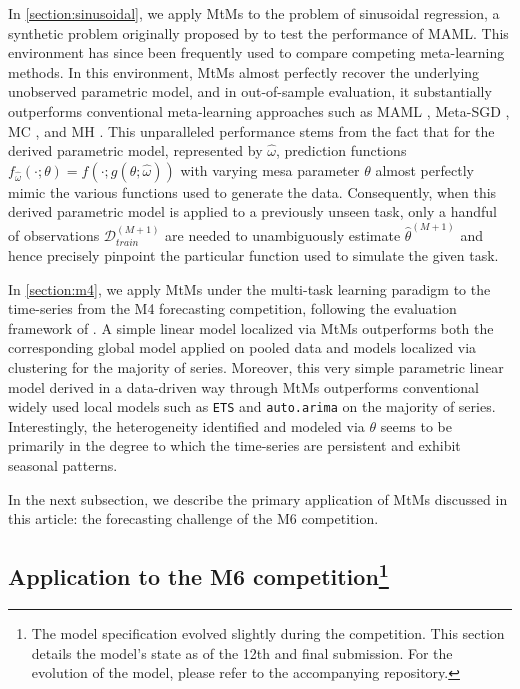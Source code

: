 \documentclass[3p,times,twocolumn]{elsarticle}
\begin{document}
In \ref{section:sinusoidal}, we apply MtMs to the problem of sinusoidal regression, a synthetic problem originally proposed by \citet{finnModelAgnosticMetaLearningFast2017} to test the performance of MAML.
This environment has since been frequently used to compare competing meta-learning methods.
In this environment, MtMs almost perfectly recover the underlying unobserved parametric model, and in out-of-sample evaluation, it substantially outperforms conventional meta-learning approaches such as MAML \citep{finnModelAgnosticMetaLearningFast2017}, Meta-SGD \citep{liMetaSGDLearningLearn2017}, MC \citep{parkMetacurvature2019}, and MH \citep{zhaoMetaLearningHypernetworks2020}.
This unparalleled performance stems from the fact that for the derived parametric model, represented by $\hat{\omega}$, prediction functions $f_{\hat{\omega}}(\cdot;\theta)=f(\cdot;g(\theta;\hat{\omega}))$ with varying mesa parameter $\theta$ almost perfectly mimic the various functions used to generate the data.
Consequently, when this derived parametric model is applied to a previously unseen task, only a handful of observations $\mathcal{D}_{train}^{(M+1)}$ are needed to unambiguously estimate $\hat{\theta}^{(M+1)}$ and hence precisely pinpoint the particular function used to simulate the given task.

In \ref{section:m4}, we apply MtMs under the multi-task learning paradigm to the time-series from the M4 forecasting competition, following the evaluation framework of \citet{montero-mansoPrinciplesAlgorithmsForecasting2021}.
A simple linear model localized via MtMs outperforms both the corresponding global model applied on pooled data and models localized via clustering for the majority of series.
Moreover, this very simple parametric linear model derived in a data-driven way through MtMs outperforms conventional widely used local models such as \texttt{ETS} \citep{hyndmanStateSpaceFramework2002a} and \texttt{auto.arima} \citep{hyndmanAutomaticTimeSeries2008a} on the majority of series.
Interestingly, the heterogeneity identified and modeled via $\theta$ seems to be primarily in the degree to which the time-series are persistent and exhibit seasonal patterns.

In the next subsection, we describe the primary application of MtMs discussed in this article: the forecasting challenge of the M6 competition.

\subsection[Application to M6 competition]{Application to the M6 competition\footnote{
        The model specification evolved slightly during the competition. 
        This section details the model's state as of the 12th and final submission. 
        For the evolution of the model, please refer to the accompanying repository.
    }
}\label{subsectition:mtms_application}
\end{document}
